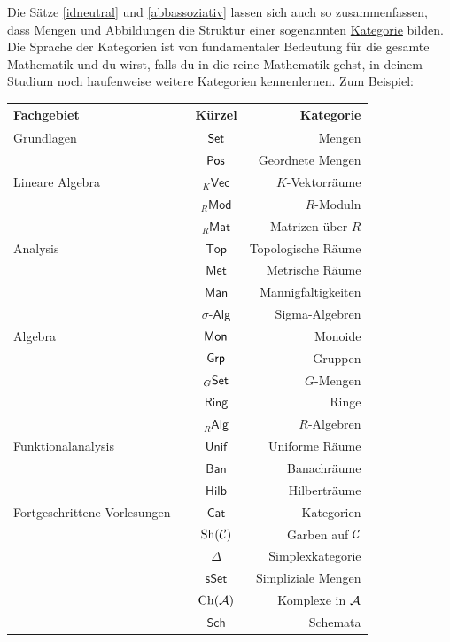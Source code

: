 \begin{vorschau} \label{kategorien}
    Die Sätze \cref{idneutral} und \cref{abbassoziativ} lassen sich auch so zusammenfassen, dass Mengen und Abbildungen die Struktur einer sogenannten \href{https://ncatlab.org/nlab/show/category}{Kategorie} bilden. Die Sprache der Kategorien ist von fundamentaler Bedeutung für die gesamte Mathematik und du wirst, falls du in die reine Mathematik gehst, in deinem Studium noch haufenweise weitere Kategorien kennenlernen. Zum Beispiel:
    \begin{longtable}{lccr}
    Fachgebiet & \phantom{Platzhalter} & Kürzel & \phantom{Platzhalterhalter} Kategorie \\
    \midrule
    Grundlagen && $\mathsf{Set}$ & Mengen \\ 
    && $\mathsf{Pos}$ & Geordnete Mengen \\[0.5em]
    Lineare Algebra && ${}_K\mathsf{Vec}$ & $K$-Vektorräume \\
    && ${}_R\mathsf{Mod}$ & $R$-Moduln \\
    && ${}_R\mathsf{Mat}$ & Matrizen über $R$ \\[0.5em]
    Analysis && $\mathsf{Top}$ & Topologische Räume \\
    && $\mathsf{Met}$ & Metrische Räume \\
    && $\mathsf{Man}$ & Mannigfaltigkeiten \\
    && $\sigma\textsf{-Alg}$ & Sigma-Algebren \\[0.5em]
    Algebra && $\mathsf{Mon}$ & Monoide \\
    && $\mathsf{Grp}$ & Gruppen \\
    && ${}_G\mathsf{Set}$ & $G$-Mengen \\
    && $\mathsf{Ring}$ & Ringe \\
    && ${}_R\mathsf{Alg}$ & $R$-Algebren \\[0.5em]
    Funktionalanalysis && $\mathsf{Unif}$ & Uniforme Räume \\
    && $\mathsf{Ban}$ & Banachräume \\
    && $\mathsf{Hilb}$ & Hilberträume \\[0.5em]
    Fortgeschrittene Vorlesungen && $\mathsf{Cat}$ & Kategorien \\
    && $\operatorname{Sh}(\mathcal C)$ & Garben auf $\mathcal C$ \\
    && $\Delta$ & Simplexkategorie \\
    && $\mathsf{sSet}$ & Simpliziale Mengen \\
    && $\operatorname{Ch}(\mathcal A)$ & Komplexe in $\mathcal A$ \\
    && $\mathsf{Sch}$ & Schemata \\
    \end{longtable}
\end{vorschau}


